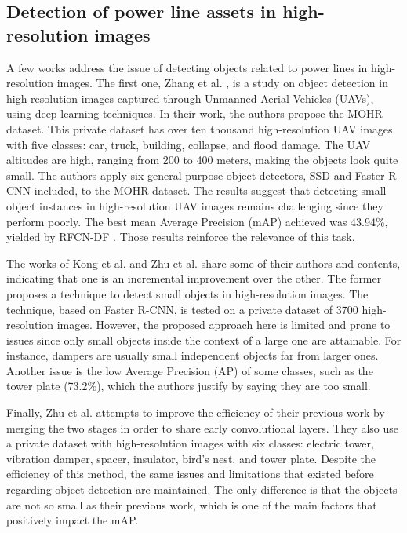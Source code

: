 \documentclass[10pt,conference]{IEEEtran}
\begin{document}
\subsection{Detection of power line assets in high-resolution images}


















A few works address the issue of detecting objects related to power lines in high-resolution images. The first one, Zhang et al. \cite{zhang2019learning}, is a study on object detection in high-resolution images captured through Unmanned Aerial Vehicles (UAVs), using deep learning techniques. In their work, the authors propose the MOHR dataset. This private dataset has over ten thousand high-resolution UAV images with five classes: car, truck, building, collapse, and flood damage. The UAV altitudes are high, ranging from 200 to 400 meters, making the objects look quite small. The authors apply six general-purpose object detectors, SSD \cite{liu2016ssd} and Faster R-CNN \cite{ren2015faster} included, to the MOHR dataset. The results suggest that detecting small object instances in high-resolution UAV images remains challenging since they perform poorly. The best mean Average Precision (mAP) achieved was 43.94\%, yielded by RFCN-DF \cite{dai2017deformable}. Those results reinforce the relevance of this task.

The works of Kong et al. \cite{kong2018context} and Zhu et al. \cite{zhu2018multi} share some of their authors and contents, indicating that one is an incremental improvement over the other. The former proposes a technique to detect small objects in high-resolution images. The technique, based on Faster R-CNN, is tested on a private dataset of 3700 high-resolution images. However, the proposed approach here is limited and prone to issues since only small objects inside the context of a large one are attainable. For instance, dampers are usually small independent objects far from larger ones. Another issue is the low Average Precision (AP) of some classes, such as the tower plate (73.2\%), which the authors justify by saying they are too small.

Finally, Zhu et al. \cite{zhu2018multi} attempts to improve the efficiency of their previous work by merging the two stages in order to share early convolutional layers. They also use a private dataset with high-resolution images with six classes: electric tower, vibration damper, spacer, insulator, bird's nest, and tower plate. Despite the efficiency of this method, the same issues and limitations that existed before regarding object detection are maintained. The only difference is that the objects are not so small as their previous work, which is one of the main factors that positively impact the mAP. 
\end{document}
